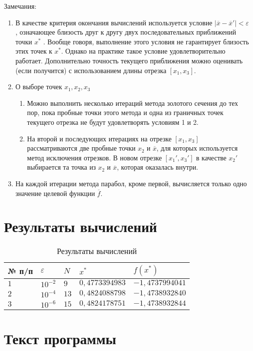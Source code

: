\documentclass{bmstu-gost-7-32}
\begin{document}

Замечания:
\begin{enumerate}
	\item В качестве критерия окончания вычислений используется условие $|\overline x - \overline x'| < \varepsilon$, означающее близость друг к другу двух последовательных приближений точки $x^*$ .
	Вообще говоря, выполнение этого условия не гарантирует близость этих точек к $x^*$.
	Однако на практике такое условие удовлетворительно работает.
	Дополнительно точность текущего приближения можно оценивать (если получится) с использованием длины отрезка $[x_1 , x_3]$.

	\item О выборе точек $x_1, x_2, x_3$
	\begin{enumerate}
		\item Можно выполнить несколько итераций метода золотого сечения до тех пор, пока пробные точки этого метода и одна из граничных точек текущего отрезка не будут удовлетворять условиям 1 и 2.

		\item На второй и последующих итерациях на отрезке $[x_1 , x_3]$ рассматриваются две пробные точки $x_2$ и $\overline x$, для которых используется метод исключения отрезков.
		В новом отрезке $[x_1', x_3']$ в качестве $x_2'$ выбирается та точка из $x_2$ и $\overline x$, которая оказалась внутри.
	\end{enumerate}
	\item На каждой итерации метода парабол, кроме первой, вычисляется только одно значение целевой функции $\overline f$.
\end{enumerate}

\section*{Результаты вычислений}

\begin{table}[H]
	\caption{Результаты вычислений}
	\begin{tabular}{|l|l|l|l|l|}
		\hline
		№ п/п & $\varepsilon$ & $N$  & $x^*$          & $f(x^*)$        \\ \hline
		$1$   & $10^{-2}$     & $9$  & $0,4773394983$ & $-1,4737994041$ \\ \hline
		$2$   & $10^{-4}$     & $13$ & $0,4824088798$ & $-1,4738932840$ \\ \hline
		$3$   & $10^{-6}$     & $15$ & $0,4824178751$ & $-1,4738932844$ \\ \hline
	\end{tabular}
\end{table}

\section*{Текст программы}


\end{document}

